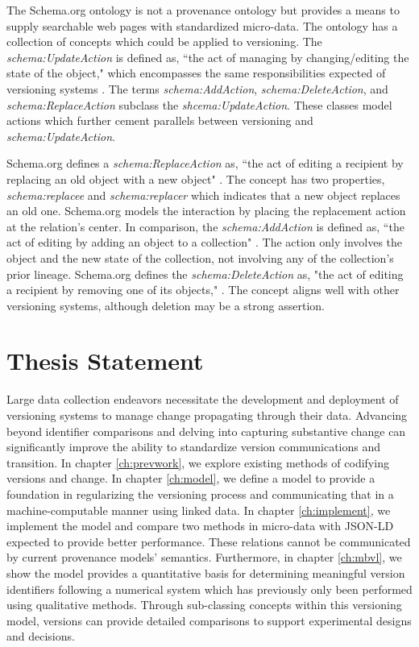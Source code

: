 The Schema.org ontology is not a provenance ontology but provides a means to supply searchable web pages with standardized micro-data.
The ontology has a collection of concepts which could be applied to versioning.
The \textit{schema:UpdateAction} is defined as, ``the act of managing by changing/editing the state of the object," which encompasses the same responsibilities expected of versioning systems \cite{Schema}.
The terms \textit{schema:AddAction}, \textit{schema:DeleteAction}, and \textit{schema:ReplaceAction} subclass the \textit{shcema:UpdateAction}.
These classes model actions which further cement parallels between versioning and \textit{schema:UpdateAction}.

Schema.org defines a \textit{schema:ReplaceAction} as, ``the act of editing a recipient by replacing an old object with a new object" \cite{SchemaRep}.
The concept has two properties, \textit{schema:replacee} and \textit{schema:replacer} which indicates that a new object replaces an old one.
Schema.org models the interaction by placing the replacement action at the relation's center.
In comparison, the \textit{schema:AddAction} is defined as, ``the act of editing by adding an object to a collection" \cite{SchemaAdd}.
The action only involves the object and the new state of the collection, not involving any of the collection's prior lineage.
Schema.org defines the \textit{schema:DeleteAction} as, "the act of editing a recipient by removing one of its objects," \cite{SchemaRem}.
The concept aligns well with other versioning systems, although deletion may be a strong assertion.

\section{Thesis Statement}

Large data collection endeavors necessitate the development and deployment of versioning systems to manage change propagating through their data.
Advancing beyond identifier comparisons and delving into capturing substantive change can significantly improve the ability to standardize version communications and transition.
In chapter \ref{ch:prevwork}, we explore existing methods of codifying versions and change.
In chapter \ref{ch:model}, we define a model to provide a foundation in regularizing the versioning process and communicating that in a machine-computable manner using linked data.
In chapter \ref{ch:implement}, we implement the model and compare two methods in micro-data with JSON-LD expected to provide better performance.
These relations cannot be communicated by current provenance models' semantics.
Furthermore, in chapter \ref{ch:mbvl}, we show the model provides a quantitative basis for determining meaningful version identifiers following a numerical system which has previously only been performed using qualitative methods.
Through sub-classing concepts within this versioning model, versions can provide detailed comparisons to support experimental designs and decisions.


